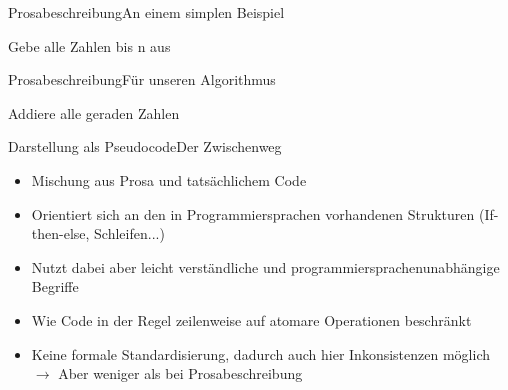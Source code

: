\begin{frame}{Prosabeschreibung}{An einem simplen Beispiel}
    \begin{alertblock}{Gebe alle Zahlen bis n aus}
    
    
      
    
    \end{alertblock}
\end{frame}

\begin{frame}{Prosabeschreibung}{Für unseren Algorithmus}
    \begin{alertblock}{Addiere alle geraden Zahlen}
    
    
      
    
    \end{alertblock}
\end{frame}

\begin{frame}{Darstellung als Pseudocode}{Der Zwischenweg}
    \begin{itemize}
        \item Mischung aus Prosa und tatsächlichem Code
        \item Orientiert sich an den in Programmiersprachen vorhandenen Strukturen (If-then-else, Schleifen...)
        \item Nutzt dabei aber leicht verständliche und programmiersprachenunabhängige Begriffe
        \item Wie Code in der Regel zeilenweise auf atomare Operationen beschränkt
        \item Keine formale Standardisierung, dadurch auch hier Inkonsistenzen möglich $\rightarrow$ Aber weniger als bei Prosabeschreibung
    \end{itemize}
\end{frame}

